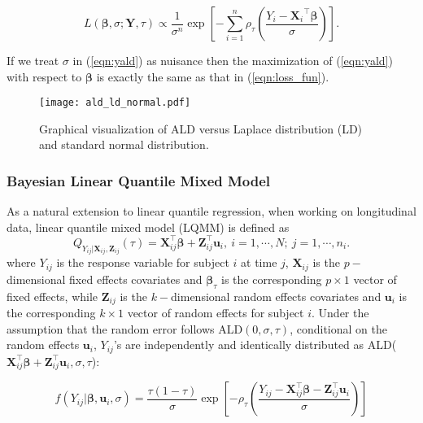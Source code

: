 \begin{equation}\label{eqn:yald}
L(\boldsymbol{\beta}, \sigma; {\boldsymbol Y}, \tau)\propto\frac{1}{\sigma^n}\exp\left[-\sum_{i=1}^n\rho_{\tau}\left(\frac{Y_i-{\boldsymbol X_i}^{\top}\boldsymbol{\beta}}{\sigma}\right)\right].
\end{equation}

If we treat $\sigma$ in (\ref{eqn:yald}) as nuisance then the maximization of (\ref{eqn:yald}) with respect to $\boldsymbol{\beta}$ is exactly the same as that in (\ref{eqn:loss_fun}).

\begin{figure}[H]
\label{fig:ald_ld}
\begin{center}
\texttt{[image: ald\_ld\_normal.pdf]}
\caption{Graphical visualization of ALD versus Laplace distribution (LD) and standard normal distribution.}
\end{center}
\end{figure}


\subsubsection{Bayesian Linear Quantile Mixed Model}\label{sec:BLQMM}%

As a natural extension to linear quantile regression, when working on longitudinal data, linear quantile mixed model (LQMM) is defined as
\begin{equation}\label{eqn:lqmm}
Q_{Y_{ij}|{\boldsymbol X}_{ij},{\boldsymbol Z}_{ij}}(\tau)={\boldsymbol X}_{ij}^{\top} \boldsymbol{\beta}+ {\boldsymbol Z}_{ij}^{\top}\boldsymbol{u}_i,\ i=1, \cdots, N;\ j=1,\cdots, n_i.
\end{equation}
where $Y_{ij}$ is the response variable for subject $i$ at time $j$, ${\boldsymbol X}_{ij}$ is the $p-$dimensional fixed effects covariates and $\boldsymbol{\beta}_{\tau}$ is the corresponding $p\times1$ vector of fixed effects, while ${\boldsymbol Z}_{ij}$ is the $k-$dimensional random effects covariates and $\boldsymbol{u}_i$ is the corresponding $k\times 1$ vector of random effects for subject $i$. Under the assumption that the random error follows ALD$(0, \sigma, \tau)$, conditional on the random effects $\boldsymbol{u}_i$, $Y_{ij}$'s are independently and identically distributed as ALD(${\boldsymbol X}_{ij}^{\top}\boldsymbol{\beta}+{\boldsymbol Z}_{ij}^{\top}\boldsymbol{u}_i, \sigma, \tau$):

\begin{equation}\label{eqn:ald_lqmm}
f(Y_{ij}|\boldsymbol{\beta},\boldsymbol{u}_i,\sigma)=\frac{\tau(1-\tau)}{\sigma}\exp\left[-\rho_{\tau}\left(\frac{Y_{ij}-{\boldsymbol X}_{ij}^{\top}\boldsymbol{\beta}-{\boldsymbol Z}_{ij}^{\top}\boldsymbol{u}_i}{\sigma}\right)\right]
\end{equation}

